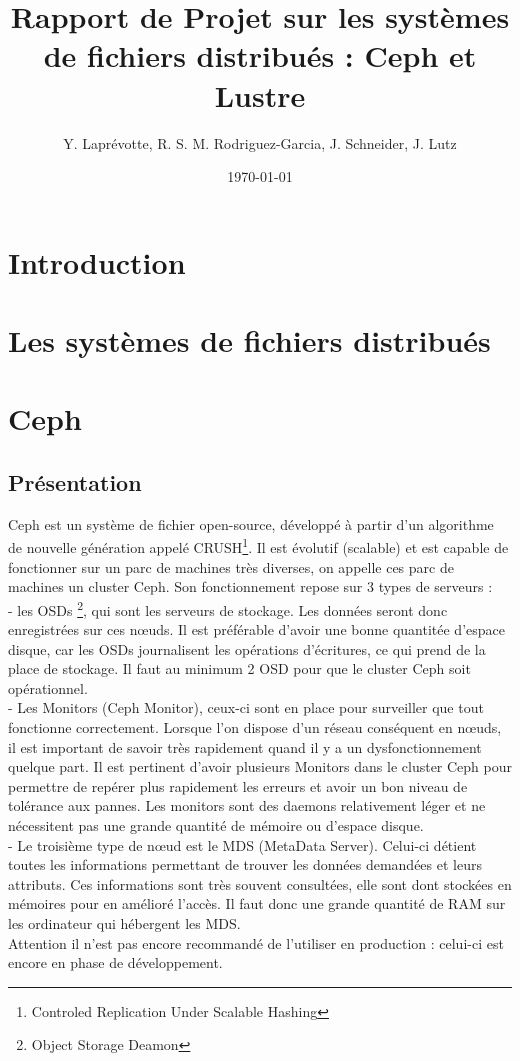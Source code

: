 \documentclass{article}
\title{Rapport de  Projet sur les systèmes de fichiers distribués : Ceph et Lustre}
\author{Y. Laprévotte, R. S. M. Rodriguez-Garcia, J. Schneider, J. Lutz}
\date{\today}
\begin{document}
\pagestyle{fancy}
\lfoot{\today}
 
\maketitle

\newpage
\tableofcontents
\newpage

	\section{Introduction}
	
	\section{Les systèmes de fichiers distribués}
\newpage
	\section{Ceph}
	\subsection{Présentation}
	Ceph est un système de fichier open-source, développé à partir d'un algorithme de nouvelle
génération appelé CRUSH\footnote{ Controled Replication Under Scalable Hashing}. Il est évolutif (scalable) et est capable de fonctionner sur un parc de machines très diverses, on appelle ces parc de machines un cluster Ceph. Son fonctionnement repose sur 3 types de serveurs :
\\	- les OSDs \footnote{ Object Storage Deamon}, qui sont les serveurs de stockage. Les données seront donc enregistrées sur ces nœuds. Il est préférable d'avoir une bonne quantitée d'espace disque, car les OSDs journalisent les opérations d'écritures, ce qui prend de la place de stockage. Il faut au minimum 2 OSD pour que le cluster Ceph soit opérationnel.
\\	- Les Monitors (Ceph Monitor), ceux-ci sont en place pour surveiller que tout fonctionne correctement. Lorsque l'on dispose d'un réseau conséquent en nœuds, il est important de savoir très rapidement quand il y a un dysfonctionnement quelque part. Il est pertinent d'avoir plusieurs Monitors dans le cluster Ceph pour permettre de repérer plus rapidement les erreurs et avoir un bon niveau de tolérance aux pannes. Les monitors sont des daemons relativement léger et ne nécessitent pas une grande quantité de mémoire ou d'espace disque.
\\	- Le troisième type de nœud est le MDS (MetaData Server). Celui-ci détient toutes les informations permettant de trouver les données demandées et leurs attributs. Ces informations sont très souvent consultées, elle sont dont stockées en mémoires pour en amélioré l'accès. Il faut donc une grande quantité de RAM sur les ordinateur qui hébergent les MDS.
\\ Attention il n'est pas encore recommandé de l'utiliser en production : celui-ci est encore en phase de développement.
\newpage
\end{document}

